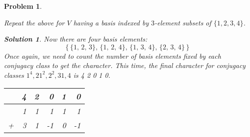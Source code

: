 \documentclass{article}
\theoremstyle{normal}
\newtheorem{problem}{Problem}
\theoremstyle{thmit}
\newtheorem*{solution}{Solution}
\begin{document}
\begin{problem}
\begin{enumerate}
            Repeat the above for $V$ having a basis indexed by $3$-element subsets
            of $\{1,2,3,4\}$.
            \begin{solution}
                Now there are four basis elements:
                \begin{equation}
                    \big\{\,
                        \{1,\,2,\,3\},\,
                        \{1,\,2,\,4\},\,
                        \{1,\,3,\,4\},\,
                        \{2,\,3,\,4\}\,
                    \big\}
                \end{equation}
                Once again, we need to count the number of basis elements fixed by each conjugacy class to
                get the character. This time, the final character for conjugacy classes $1^4, 2 1^2, 2^2, 31,
                4$ is 4 2 0 1 0.
                \begin{table}[h]
                \centering
                    \begin{tabular}{rrrrrr}
                           & 4 & 2 & 0 & 1 & 0  \\ 
                           \hline 
                           & 1 & 1 & 1 & 1 & 1 \\
                         + & 3 & 1 & -1 & 0 & -1
                    \end{tabular}
                \end{table}
            \end{solution}
    \end{enumerate}
\end{problem}
\end{document}
